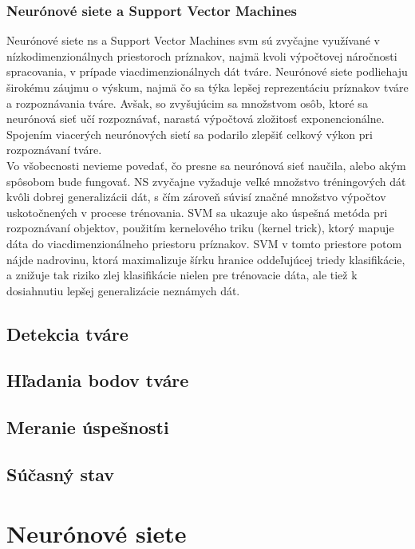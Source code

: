 \subsubsection{Neurónové siete a Support Vector Machines}
Neurónové siete \acrshort{ns} a Support Vector Machines \acrshort{svm} sú zvyčajne využívané v nízkodimenzionálnych priestoroch príznakov, najmä kvoli výpočtovej náročnosti spracovania,
v prípade viacdimenzionálnych dát tváre\cite{handbookbio}.
Neurónové siete podliehaju širokému záujmu o výskum, najmä čo sa týka lepšej reprezentáciu príznakov tváre a rozpoznávania tváre.
Avšak, so zvyšujúcim sa množstvom osôb, ktoré sa neurónová sieť učí rozpoznávať, narastá výpočtová zložitosť exponencionálne.
Spojením viacerých neurónových sietí sa podarilo zlepšiť celkový výkon pri rozpoznávaní tváre.\\
\indent Vo všobecnosti nevieme povedať, čo presne sa neurónová sieť naučila, alebo akým spôsobom bude fungovať.
NS zvyčajne vyžaduje veľké množstvo tréningových dát kvôli dobrej generalizácii dát, s čím zároveň súvisí značné množstvo výpočtov uskotočnených v procese trénovania.
SVM sa ukazuje ako úspešná metóda pri rozpoznávaní objektov, použitím kernelového triku (kernel trick), ktorý mapuje dáta do viacdimenzionálneho priestoru príznakov.
SVM v tomto priestore potom nájde nadrovinu, ktorá maximalizuje šírku hranice oddeľujúcej triedy klasifikácie, a znižuje tak riziko zlej klasifikácie nielen pre trénovacie dáta,
ale tiež k dosiahnutiu lepšej generalizácie neznámych dát.\cite{handbookbio}

\subsection{Detekcia tváre}
\subsection{Hľadania bodov tváre}
\subsection{Meranie úspešnosti}
\subsection{Súčasný stav}


\section{Neurónové siete}
